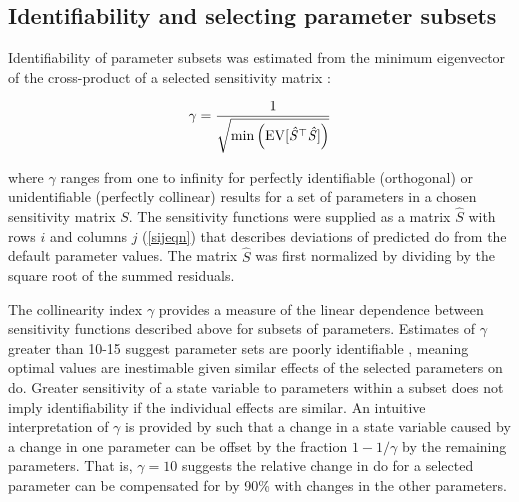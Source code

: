 \documentclass[letterpaper,12pt,oneside]{article}\usepackage[]{graphicx}\usepackage[]{color}
\begin{document}
\subsection{Identifiability and selecting parameter subsets}

Identifiability of parameter subsets was estimated from the minimum eigenvector of the cross-product of a selected sensitivity matrix \citep{Brun01,Omlin01}:

\begin{equation} \label{gameq}
\gamma = \frac{1} {\sqrt{ \min \left(\rm{EV}[\mathit{\hat{S}}^\top \mathit{\hat{S}}]\right)}}
\end{equation}

\noindent where $\gamma$ ranges from one to infinity for perfectly identifiable (orthogonal) or unidentifiable (perfectly collinear) results for a set of parameters in a chosen sensitivity matrix $S$.  The sensitivity functions were supplied as a matrix $\hat{S}$ with rows $i$ and columns $j$ (\cref{sijeqn}) that describes deviations of predicted \ac{do} from the default parameter values.  The matrix $\hat{S}$ was first normalized by dividing by the square root of the summed residuals\citep{Omlin01,Soetaert10}. 

The collinearity index $\gamma$ provides a measure of the linear dependence between sensitivity functions described above for subsets of parameters. Estimates of $\gamma$ greater than 10-15 suggest parameter sets are poorly identifiable \citep{Brun01,Omlin01}, meaning optimal values are inestimable given similar effects of the selected parameters on \ac{do}. Greater sensitivity of a state variable to parameters within a subset does not imply identifiability if the individual effects are similar.  An intuitive interpretation of $\gamma$ is provided by \citet{Brun01} such that a change in a state variable caused by a change in one parameter can be offset by the fraction $1 - 1/\gamma$ by the remaining parameters.  That is, $\gamma = 10$ suggests the relative change in \ac{do} for a selected parameter can be compensated for by 90\% with changes in the other parameters. 
\end{document}
